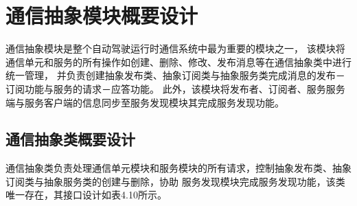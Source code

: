 \section{通信抽象模块概要设计}
通信抽象模块是整个自动驾驶运行时通信系统中最为重要的模块之一，
该模块将通信单元和服务的所有操作如创建、删除、修改、发布消息等在通信抽象类中进行统一管理，
并负责创建抽象发布类、抽象订阅类与抽象服务类完成消息的发布－订阅功能与服务的请求－应答功能。
此外，该模块将发布者、订阅者、服务服务端与服务客户端的信息同步至服务发现模块其完成服务发现功能。


\subsection{通信抽象类概要设计}
通信抽象类负责处理通信单元模块和服务模块的所有请求，控制抽象发布类、抽象订阅类与抽象服务类的创建与删除，协助
服务发现模块完成服务发现功能，该类唯一存在，其接口设计如表4.10所示。
 
